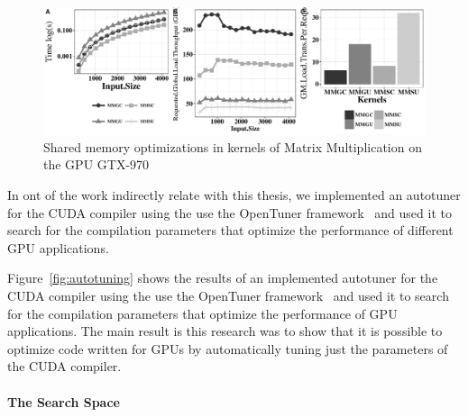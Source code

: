 \begin{figure}[htpb]
	\centering
    \includegraphics[scale=.5]{images/plotCoalescedShared.pdf}
    \caption{Shared memory optimizations in kernels of Matrix Multiplication on the GPU GTX-970}
    \label{fig:Shared}
\end{figure}

In ont of the work indirectly relate with this thesis, we implemented an autotuner for the CUDA compiler using the use the OpenTuner 
framework~\cite{ansel2014opentuner} and used it to search for the compilation parameters  that optimize the performance of different GPU applications.

Figure~\ref{fig:autotuning} shows the results of an implemented autotuner for the CUDA compiler using the use the OpenTuner framework~\citep{ansel2014opentuner} and used it to search for the compilation parameters that optimize the performance of GPU applications. The main result is this research was to show that it is possible to optimize code written for GPUs by automatically tuning just the parameters of the CUDA compiler.

\paragraph{The Search Space}\label{sec:parameters}



